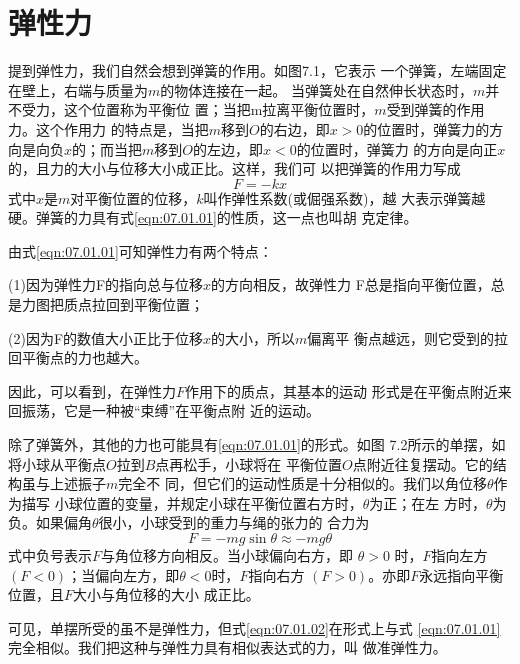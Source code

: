 \section{弹性力}\label{sec:07.01}

提到弹性力，我们自然会想到弹簧的作用。如图7.1，它表示
一个弹簧，左端固定在壁上，右端与质量为$ m $的物体连接在一起。
当弹簧处在自然伸长状态时，$ m $并不受力，这个位置称为平衡位
置；当把m拉离平衡位置时，$ m $受到弹簧的作用力。这个作用力
的特点是，当把$ m $移到$ O $的右边，即$  x > 0   $的位置时，弹簧力的方
向是向负$ x $的；而当把$ m $移到$ O $的左边，即$ x<0 $的位置时，弹簧力
的方向是向正$ x $的，且力的大小与位移大小成正比。这样，我们可
以把弹簧的作用力写成
\begin{equation}\label{eqn:07.01.01}
	F = - k x 
\end{equation}
式中$ x $是$ m $对平衡位置的位移，$ k $叫作弹性系数(或倔强系数)，越
大表示弹簧越硬。弹簧的力具有式\eqref{eqn:07.01.01}的性质，这一点也叫胡
克定律。

由式\eqref{eqn:07.01.01}可知弹性力有两个特点：

(1)因为弹性力F的指向总与位移$ x $的方向相反，故弹性力
F总是指向平衡位置，总是力图把质点拉回到平衡位置；

(2)因为F的数值大小正比于位移$ x $的大小，所以$ m $偏离平
衡点越远，则它受到的拉回平衡点的力也越大。

因此，可以看到，在弹性力$ F $作用下的质点，其基本的运动
形式是在平衡点附近来回振荡，它是一种被“束缚”在平衡点附
近的运动。

除了弹簧外，其他的力也可能具有\eqref{eqn:07.01.01}的形式。如图
7.2所示的单摆，如将小球从平衡点$ O $拉到$ B $点再松手，小球将在
平衡位置$ O $点附近往复摆动。它的结构虽与上述振子$ m $完全不
同，但它们的运动性质是十分相似的。我们以角位移$ \theta $作为描写
小球位置的变量，并规定小球在平衡位置右方时，$ \theta $为正；在左
方时，$ \theta $为负。如果偏角$ \theta $很小，小球受到的重力与绳的张力的
合力为
\begin{equation}\label{eqn:07.01.02}
	F = - m g \sin \theta \approx - m g \theta  
\end{equation}
式中负号表示$ F $与角位移方向相反。当小球偏向右方，即 $ \theta > 0  $
时，$ F $指向左方$ ( F < 0 ) $；当偏向左方，即$  \theta < 0   $时，$ F $指向右方
$ ( F > 0 ) $。亦即$ F $永远指向平衡位置，且$ F $大小与角位移的大小
成正比。

可见，单摆所受的虽不是弹性力，但式\eqref{eqn:07.01.02}在形式上与式
\eqref{eqn:07.01.01}完全相似。我们把这种与弹性力具有相似表达式的力，叫
做准弹性力。

